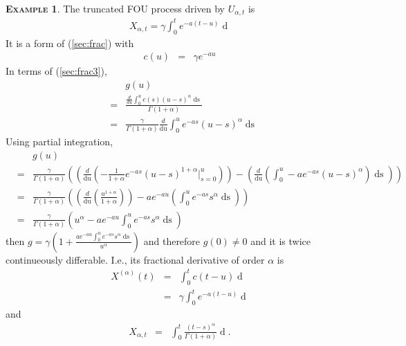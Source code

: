 \documentclass[a4paper, twoside, 11pt]{article}
\theoremstyle{definition}
\newtheorem{example}[definition]{\scshape Example}
\newcommand{\brkt}[1]{\left({#1} \right)}
\begin{document}
  \begin{example}
  The truncated FOU process driven by $U_{\alpha, t}$ is 
  \begin{eqnarray}
  X_{\alpha,t} = \gamma\int_0^t e^{-a(t-u)}\mathop{dU_{\alpha, u}} 
  \label{sec:cc2}
\end{eqnarray}
It is a form of (\ref{sec:frac}) with
\begin{eqnarray*}
  c(u) &=&  \gamma e^{-au}
\end{eqnarray*}
In terms of (\ref{sec:frac3}),
\begin{eqnarray*}
  &&g(u)\\
  &=& \frac{\frac{d}{du}\int_0^{u} c(s)(u-s)^\alpha \mathop{ds}}{\Gamma(1+\alpha)}\\
  &=& \frac{\gamma}{\Gamma(1+\alpha)}\frac{d}{\mathop{du}}\int_0^u e^{-as} (u-s)^\alpha \mathop{ds}
\end{eqnarray*}
Using partial integration,
\begin{eqnarray*}
  &&g(u)\\
  &=& \frac{\gamma}{\Gamma(1+\alpha)}\brkt{\brkt{\frac{d}{\mathop{du}} (-\frac{1}{1+\alpha}e^{-as}(u-s)^{1+\alpha}|_{s=0}^u)} - \brkt{\frac{d}{\mathop{du}}(\int_0^u -a e^{-as}(u-s)^\alpha)\mathop{ds}}}\\
  &=& \frac{\gamma}{\Gamma(1+\alpha)}\brkt{\brkt{\frac{d}{\mathop{du}}(\frac{u^{1+\alpha}}{1+\alpha})} - a e^{-au}\brkt{\int_0^u e^{-as}s^\alpha\mathop{ds}}}\\
  &=& \frac{\gamma}{\Gamma(1+\alpha)} (u^\alpha - a e^{-au}\int_0^u e^{-as}s^\alpha\mathop{ds})
\end{eqnarray*}
then $g = \gamma (1 + \frac{a e^{-au}\int_0^u e^{-as}s^\alpha\mathop{ds}}{u^\alpha})$ and therefore $g(0)\neq 0$ and it is twice continueously differable. I.e., its fractional derivative of order $\alpha$ is 
\begin{eqnarray*}
  X^{(\alpha)}(t) &=&  \int_0^t c(t-u) \mathop{dB_u}\\
  &=& \gamma\int_0^t e^{-a(t-u)}\mathop{dB_u}
\end{eqnarray*}
and 
\begin{eqnarray*}
  X_{\alpha,t} &=& \int_0^t \frac{(t-s)^\alpha}{\Gamma(1+\alpha)} \mathop{dX^{(\alpha)}(s)}.
\end{eqnarray*}
\end{example}
\end{document}
